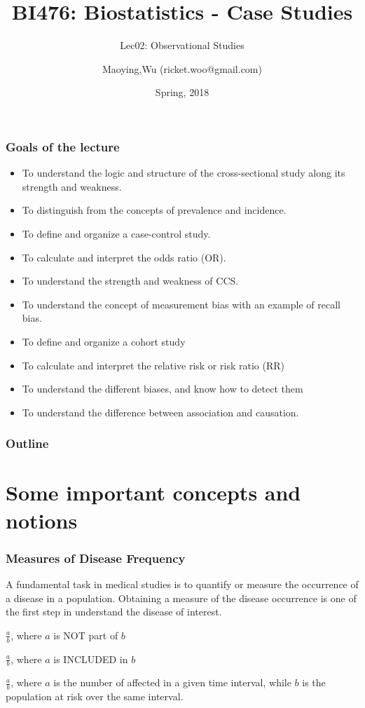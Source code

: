 \documentclass[table,10pt]{beamer}
\title[BI476]{BI476: Biostatistics - Case Studies}
\subtitle[observation]{Lec02: Observational Studies}
\author[Maoying Wu]{Maoying,Wu ({\small ricket.woo@gmail.com})}
\institute[CBB] %
{
  \inst{}
  Dept. of Bioinformatics \& Biostatistics\\
  Shanghai Jiao Tong University
}
\date{Spring, 2018}
\begin{document}
\begin{CJK*}{UTF8}{gbsn}

\frame{\titlepage}

\begin{frame}
\frametitle{Goals of the lecture}
\begin{itemize}[<+->]
	\item To understand the logic and structure of the cross-sectional study along 
		its strength and weakness.
	\item To distinguish from the concepts of prevalence and incidence.
	\item To define and organize a case-control study.
	\item To calculate and interpret the odds ratio (OR).
	\item To understand the strength and weakness of CCS.
	\item To understand the concept of measurement bias with an example of recall bias.
	\item To define and organize a cohort study
	\item To calculate and interpret the relative risk or risk ratio (RR)
	\item To understand the different biases, and know how to detect them
	\item To understand the difference between association and causation.
\end{itemize}
\end{frame}

\begin{frame}
\frametitle{Outline}
	\tableofcontents
\end{frame}


\section{Some important concepts and notions}


\begin{frame}[t]
\frametitle{Measures of Disease Frequency}
A fundamental task in medical studies is to quantify or measure the \alert{occurrence of 
a disease in a population}. Obtaining a measure of the disease occurrence is one of the 
first step in understand the disease of interest.
\begin{description}[<+->]
	\item[\alert{Ratios}]{$\frac{a}{b}$, where $a$ is NOT part of $b$}
	\item[\alert{Proportions}]{$\frac{a}{b}$, where $a$ is INCLUDED in $b$}
	\item[\alert{Rates}]{$\frac{a}{b}$, where $a$ is the number of affected in a given time 
		interval, while $b$ is the population at risk over the same interval.}
\end{description}
\end{frame}


\end{CJK*}
\end{document}
